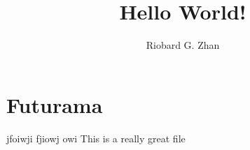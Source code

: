\documentclass{article}
\author{Riobard G. Zhan}
\title{Hello World!}
\begin{document}
\section{Futurama}

jfoiwji fjiowj owi This is a really great file
\end{document}
